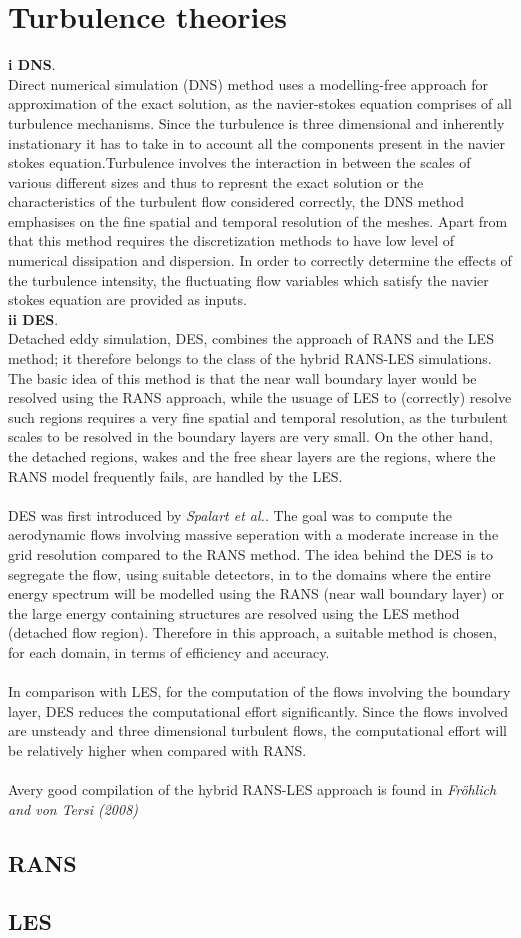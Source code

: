 \newpage

\section{Turbulence theories}
{\bf i DNS}.\\
Direct numerical simulation (DNS) method uses a modelling-free approach for approximation of the exact solution, as the navier-stokes equation comprises of all turbulence mechanisms. Since the turbulence is three dimensional and inherently instationary it has to take in to account all the components present in the navier stokes equation.Turbulence involves the interaction in between the scales of various different sizes and thus to represnt the exact solution or the characteristics of the turbulent flow considered correctly, the DNS method emphasises on the fine spatial and temporal resolution of the meshes. Apart from that this method requires the discretization methods to have low level of numerical dissipation and dispersion. In order to correctly determine the effects of the turbulence intensity, the fluctuating flow variables which satisfy the navier stokes equation are provided as inputs.
\\
{\bf ii DES}.\\
Detached eddy simulation, DES, combines the approach of RANS and the LES method; it therefore belongs to the class of the hybrid RANS-LES simulations. The basic idea of this method is that the near wall boundary layer would be resolved using the RANS approach, while the usuage of LES to (correctly) resolve such regions requires a very fine spatial and temporal resolution, as the turbulent scales to be resolved in the boundary layers are very small. On the other hand, the detached regions, wakes and the free shear layers are the regions, where the RANS model frequently fails, are handled by the LES.\\
\\
 DES was first introduced by {\it Spalart et al.}. The goal was to compute the aerodynamic flows involving massive seperation with a moderate increase in the grid resolution compared to the RANS method. The idea behind the DES is to segregate the flow, using suitable detectors, in to the domains where the entire energy spectrum will be modelled using the RANS (near wall boundary layer) or the large energy containing structures are resolved using the LES method (detached flow region). Therefore in this approach, a suitable method is chosen, for each domain, in terms of efficiency and accuracy.\\
\\
In comparison with LES, for the computation of the flows involving the boundary layer, DES reduces the computational effort significantly. Since the flows involved are unsteady and three dimensional turbulent flows, the computational effort will be relatively higher when compared with RANS.\\
\\
Avery good compilation of the hybrid RANS-LES approach is found in {\it Fröhlich and von Tersi (2008)}\\
\subsection{RANS}
\subsection{LES}